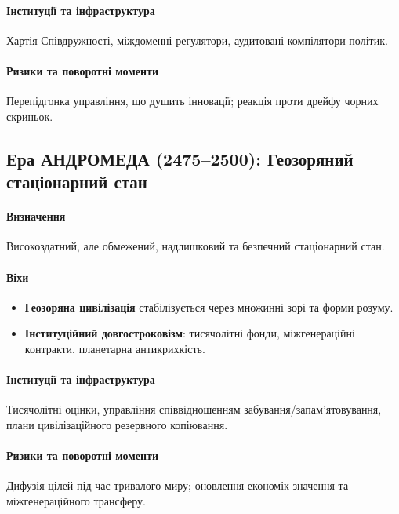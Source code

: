\documentclass[11pt]{article}
\begin{document}
\paragraph{Інституції та інфраструктура} Хартія Співдружності, міждоменні регулятори, аудитовані компілятори політик.

\paragraph{Ризики та поворотні моменти} Перепідгонка управління, що душить інновації; реакція проти дрейфу чорних скриньок.

\subsection{Ера АНДРОМЕДА (2475–2500): Геозоряний стаціонарний стан}
\paragraph{Визначення} Високоздатний, але обмежений, надлишковий та безпечний стаціонарний стан.

\paragraph{Віхи}
\begin{itemize}[noitemsep]
  \item \textbf{Геозоряна цивілізація} стабілізується через множинні зорі та форми розуму.
  \item \textbf{Інституційний довгостроковізм}: тисячолітні фонди, міжгенераційні контракти, планетарна антикрихкість.
\end{itemize}

\paragraph{Інституції та інфраструктура} Тисячолітні оцінки, управління співвідношенням забування/запам'ятовування, плани цивілізаційного резервного копіювання.

\paragraph{Ризики та поворотні моменти} Дифузія цілей під час тривалого миру; оновлення економік значення та міжгенераційного трансферу.
\end{document}
